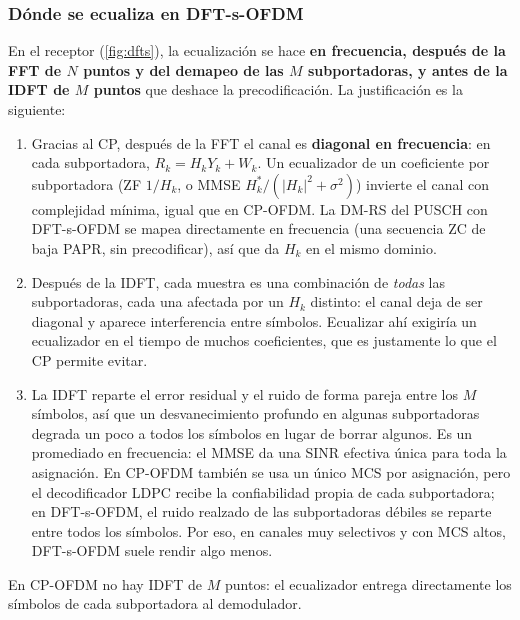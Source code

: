 \subsubsection{Dónde se ecualiza en DFT-s-OFDM}\label{sec:ecualizacion}
En el receptor (\cref{fig:dfts}), la ecualización se hace \textbf{en frecuencia, después de la FFT de $N$ puntos y del demapeo de las $M$ subportadoras, y antes de la IDFT de $M$ puntos} que deshace la precodificación. La justificación es la siguiente:
\begin{enumerate}
  \item Gracias al CP, después de la FFT el canal es \textbf{diagonal en frecuencia}: en cada subportadora, $R_k = H_k Y_k + W_k$. Un ecualizador de un coeficiente por subportadora (ZF $1/H_k$, o MMSE $H_k^*/(|H_k|^2+\sigma^2)$) invierte el canal con complejidad mínima, igual que en CP-OFDM. La DM-RS del PUSCH con DFT-s-OFDM se mapea directamente en frecuencia (una secuencia ZC de baja PAPR, sin precodificar), así que da $H_k$ en el mismo dominio.
  \item Después de la IDFT, cada muestra es una combinación de \emph{todas} las subportadoras, cada una afectada por un $H_k$ distinto: el canal deja de ser diagonal y aparece interferencia entre símbolos. Ecualizar ahí exigiría un ecualizador en el tiempo de muchos coeficientes, que es justamente lo que el CP permite evitar.
  \item La IDFT reparte el error residual y el ruido de forma pareja entre los $M$ símbolos, así que un desvanecimiento profundo en algunas subportadoras degrada un poco a todos los símbolos en lugar de borrar algunos. Es un promediado en frecuencia: el MMSE da una SINR efectiva única para toda la asignación. En CP-OFDM también se usa un único MCS por asignación, pero el decodificador LDPC recibe la confiabilidad propia de cada subportadora; en DFT-s-OFDM, el ruido realzado de las subportadoras débiles se reparte entre todos los símbolos. Por eso, en canales muy selectivos y con MCS altos, DFT-s-OFDM suele rendir algo menos.
\end{enumerate}
En CP-OFDM no hay IDFT de $M$ puntos: el ecualizador entrega directamente los símbolos de cada subportadora al demodulador.

